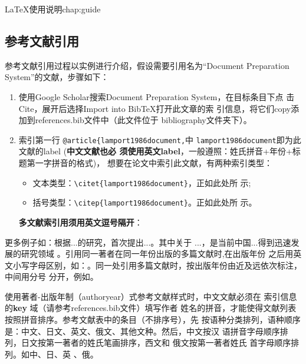 \begin{cuzchapter}{\LaTeX{}使用说明}{chap:guide}
	\subsection{参考文献引用}\label{sub:references}

	参考文献引用过程以实例进行介绍，假设需要引用名为``Document Preparation
	System''的文献，步骤如下：
	\begin{enumerate}
		\item 使用Google Scholar搜索Document Preparation System，在目标条目下点
		      击Cite，展开后选择Import into BibTeX打开此文章的索
		      引信息，将它们copy添加到references.bib文件中（此文件位于
		      bibliography文件夹下）。
		\item 索引第一行 \verb|@article{lamport1986document,|中
		      \verb|lamport1986document|即为此文献的label (\textbf{中文文献也必
			      须使用英文label}，一般遵照：姓氏拼音+年份+标题第一字拼音的格式)，
		      想要在论文中索引此文献，有两种索引类型：
		      \begin{itemize}
			      \item 文本类型：\verb|\citet{lamport1986document}|，正如此处所
			            示\citet{lamport1986document};
			      \item 括号类型：\verb|\citep{lamport1986document}|。正如此处所
			            示\citep{lamport1986document}。
		      \end{itemize}
		      \textbf{多文献索引用须用英文逗号隔开}：
	\end{enumerate}

	更多例子如：\citet{walls2013drought}根据...的研究，首次提出...。其中关于
	...\citep{walls2013drought}，是当前中国...得到迅速发展的研究领域
	\citep{chen1980zhongguo}。引用同一著者在同一年份出版的多篇文献时,在出版年份
	之后用英文小写字母区别，如：\citep{yuan2012lana, yuan2012lanb,
		yuan2012lanc}。同一处引用多篇文献时，按出版年份由近及远依次标注，中间用分号
	分开，例如\citep{chen1980zhongguo, stamerjohanns2009mathml, hls2012jinji,
		niu2013zonghe}。

	使用著者-出版年制（authoryear）式参考文献样式时，中文文献必须在
	索引信息的\textbf{key} 域（请参考references.bib文件）填写作者
	姓名的拼音，才能使得文献列表按照拼音排序。参考文献表中的条目（不排序号），先
	按语种分类排列，语种顺序是：中文、日文、英文、俄文、其他文种。然后，中文按汉
	语拼音字母顺序排列，日文按第一著者的姓氏笔画排序，西文和 俄文按第一著者姓氏
	首字母顺序排列。如中\citep{niu2013zonghe}、日\citep{Bohan1928}、英
	\citep{stamerjohanns2009mathml}、俄\citep{Dubrovin1906}。


\end{cuzchapter}
